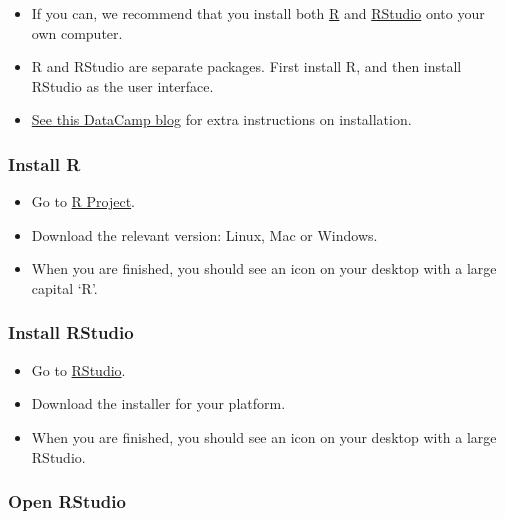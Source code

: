 \documentclass[]{article}
\begin{document}
\begin{itemize}
\item
  If you can, we recommend that you install both \href{https://cran.csiro.au/}{R} and \href{https://www.rstudio.com/products/rstudio/download/}{RStudio} onto your own computer.
\item
  R and RStudio are separate packages. First install R, and then install RStudio as the user interface.
\item
  \href{https://www.datacamp.com/community/tutorials/installing-R-windows-mac-ubuntu?utm_source=adwords_ppc\&utm_campaignid=9942305733\&utm_adgroupid=100189364546\&utm_device=c\&utm_keyword=\&utm_matchtype=b\&utm_network=g\&utm_adpostion=\&utm_creative=332602034352\&utm_targetid=aud-517318242147:dsa-929501846124\&utm_lo}{See this DataCamp blog} for extra instructions on installation.
\end{itemize}

\hypertarget{install-r}{%
\subsubsection{Install R}\label{install-r}}

\begin{itemize}
\item
  Go to \href{http://cran.csiro.au/}{R Project}.
\item
  Download the relevant version: Linux, Mac or Windows.
\item
  When you are finished, you should see an icon on your desktop with a large capital `R'.
\end{itemize}

\hypertarget{install-rstudio}{%
\subsubsection{Install RStudio}\label{install-rstudio}}

\begin{itemize}
\item
  Go to \href{https://www.rstudio.com/products/rstudio/download/}{RStudio}.
\item
  Download the installer for your platform.
\item
  When you are finished, you should see an icon on your desktop with a large RStudio.
\end{itemize}

\hypertarget{open-rstudio}{%
\subsubsection{Open RStudio}\label{open-rstudio}}
\end{document}
